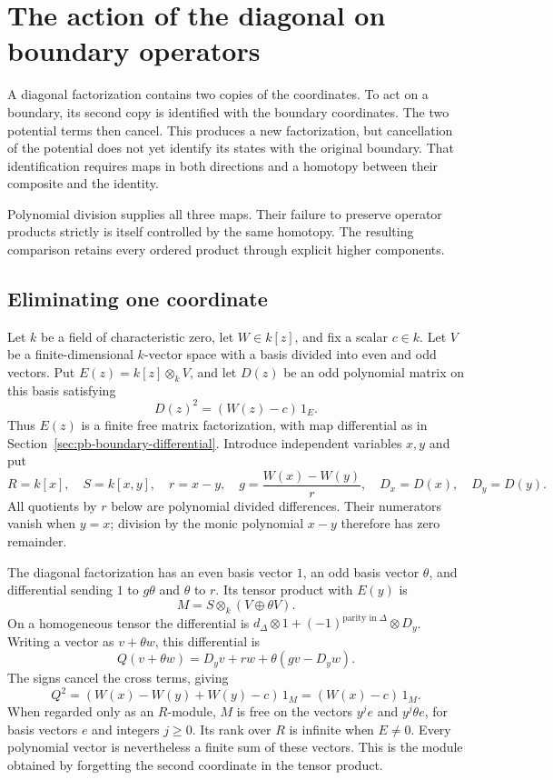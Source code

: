 \chapter{The action of the diagonal on boundary operators}
\label{ch:da-action}

A diagonal factorization contains two copies of the coordinates.
To act on a boundary, its second copy is identified with the
boundary coordinates. The two potential terms then cancel.
This produces a new factorization, but cancellation of the potential
does not yet identify its states with the original boundary.
That identification requires maps in both directions and a homotopy
between their composite and the identity.

Polynomial division supplies all three maps. Their failure to
preserve operator products strictly is itself controlled by the
same homotopy. The resulting comparison retains every ordered
product through explicit higher components.

\section{Eliminating one coordinate}
\label{sec:da-one-variable}

Let \(k\) be a field of characteristic zero, let \(W\in k[z]\), and
fix a scalar \(c\in k\). Let \(V\) be a finite-dimensional
\(k\)-vector space with a basis divided into even and odd vectors.
Put \(E(z)=k[z]\otimes_kV\), and let \(D(z)\) be an odd polynomial
matrix on this basis satisfying
\[
 D(z)^2=(W(z)-c)\,1_E.
\]
Thus \(E(z)\) is a finite free matrix factorization, with map
differential as in Section~\ref{sec:pb-boundary-differential}.
Introduce independent variables \(x,y\) and put
\[
 R=k[x],\quad S=k[x,y],\quad r=x-y,\quad
 g=\frac{W(x)-W(y)}{r},\quad D_x=D(x),\quad D_y=D(y).
\]
All quotients by \(r\) below are polynomial divided differences.
Their numerators vanish when \(y=x\); division by the monic
polynomial \(x-y\) therefore has zero remainder.

The diagonal factorization has an even basis vector \(1\), an odd
basis vector \(\theta\), and differential sending \(1\) to
\(g\theta\) and \(\theta\) to \(r\).
Its tensor product with \(E(y)\) is
\[
 M=S\otimes_k(V\oplus\theta V).
\]
On a homogeneous tensor the differential is
\(d_\Delta\otimes1+(-1)^{\text{parity in }\Delta}\otimes D_y\).
Writing a vector as \(v+\theta w\), this differential is
\begin{equation}
 Q(v+\theta w)
   =D_yv+rw+\theta(gv-D_yw).
 \label{eq:da-Q}
\end{equation}
The signs cancel the cross terms, giving
\[
 Q^2=(W(x)-W(y)+W(y)-c)\,1_M=(W(x)-c)\,1_M.
\]
When regarded only as an \(R\)-module, \(M\) is free on the
vectors \(y^j e\) and \(y^j\theta e\), for basis vectors \(e\)
and integers \(j\geq0\). Its rank over \(R\) is infinite when
\(E\ne0\).
Every polynomial vector is nevertheless a finite sum of these
vectors. This is the module obtained by forgetting the second
coordinate in the tensor product.


